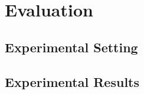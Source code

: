 \section{Evaluation}
\label{sec:eval}

\subsection{Experimental Setting}
\label{sec:expSet}

\subsection{Experimental Results}
\label{sec:results}

